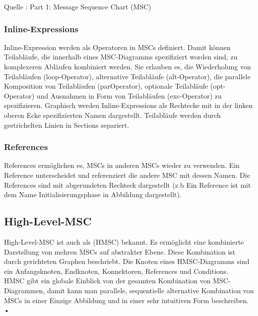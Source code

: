 

Quelle : \cite{MT009}
Part 1: Message Sequence Chart (MSC) 

 

\subsubsection{Inline-Expressions}
Inline-Expression werden als Operatoren in MSCs definiert. Damit können Teilabläufe,
die innerhalb eines MSC-Diagramms spezifiziert worden sind, zu komplexeren Abläufen kombiniert werden. Sie erlauben es, die Wiederholung von Teilabläufen (loop-Operator),
alternative Teilabläufe (alt-Operator), die parallele Komposition von Teilabläufen (parOperator), optionale Teilabläufe (opt-Operator) und Ausnahmen in Form von Teilabläufen (exc-Operator) zu spezifizieren. Graphisch werden Inline-Expressions als Rechtecke mit in der linken oberen Ecke spezifizierten Namen dargestellt. Teilabläufe werden durch gestrichelten Linien in Sections separiert.
\subsubsection{References}
References ermöglichen es, MSCs in anderen MSCs wieder
zu verwenden. 
Ein Reference unterscheidet und referenziert die andere MSC mit dessen Namen. 
Die References sind mit abgerundeten Rechteck dargestellt (z.b Ein Reference ist mit dem Name Initialisierungsphase in Abbildung dargestellt).\\


\subsection{High-Level-MSC}
High-Level-MSC ist auch als (HMSC) bekannt. Es ermöglicht eine kombinierte Darstellung von mehren MSCs auf abstrakter Ebene. Diese Kombination ist durch gerichteten Graphen beschriebt. Die Knoten eines HMSC-Diagramms sind ein Anfangsknoten, Endknoten, Konnektoren, References und Conditions.
\\ HMSC gibt ein globale Einblick von der gesamten Kombination von MSC-Diagrammen, damit kann man parallele, sequentielle alternative
Kombination von MSCs in einer Einzige Abbildung und in einer sehr intuitiven Form beschreiben.\\•






